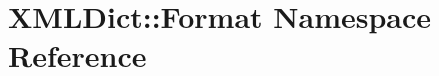 \hypertarget{namespaceXMLDict_1_1Format}{}\section{X\+M\+L\+Dict\+:\+:Format Namespace Reference}
\label{namespaceXMLDict_1_1Format}
